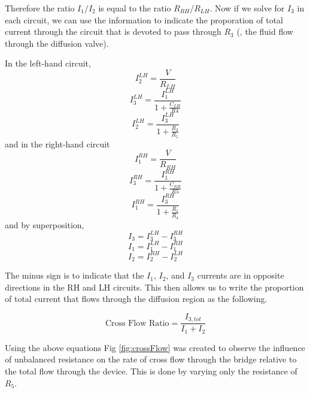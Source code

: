Therefore the ratio $I_{1}/I_{2}$ is equal to the ratio $R_{RH}/R_{LH}$. Now if we solve for $I_{3}$ in each circuit, we can use the information to indicate the proporation of total current through the circuit that is devoted to pass through $R_{3}$ (\ie , the fluid flow through the diffusion valve).

In the left-hand circuit, 
\begin{equation}
I_{2}^{LH} =\frac{V}{R_{LH}}
\end{equation}
\begin{equation}
I_{3}^{LH} =\frac{I_{1}^{LH}}{1+ \frac{C_{LH}}{R4}}
\label{equ:LHI3}
\end{equation}
\begin{equation}
I_{2}^{LH} =\frac{I_{3}^{LH}}{1+\frac{R_{2}}{R_{5}}}
\end{equation}
and in the right-hand circuit
\begin{equation}
I_{1}^{RH} =\frac{V}{R_{RH}}
\end{equation}
\begin{equation}
I_{3}^{RH} =\frac{I_{1}^{RH}}{1+ \frac{C_{RH}}{R5}}
\label{equ:LHI3b}
\end{equation}
\begin{equation}
I_{1}^{RH} =\frac{I_{3}^{RH}}{1+\frac{R_{1}}{R_{4}}}
\end{equation}
and by superposition,
\begin{equation}
I_{3} = I_{3}^{LH} - I_{3}^{RH}
\label{equ:I3}
\end{equation}
\begin{equation}
I_{1} = I_{1}^{LH} - I_{1}^{RH}
\label{equ:I1}
\end{equation}
\begin{equation}
I_{2} = I_{2}^{RH} - I_{2}^{LH}
\label{equ:I2}
\end{equation}

The minus sign is to indicate that the $I_{1}$, $I_{2}$, and $I_{3}$ currents are in opposite directions in the RH and LH circuits. This then allows us to write the proportion of total current that flows through the diffusion region as the following.

\begin{equation}
\textrm{Cross Flow Ratio} = \frac{I_{3, tot}}{I_{1} + I_{2}}
\end{equation}

Using the above equations Fig \ref{fig:crossFlow} was created to observe the influence of unbalanced resistance on the rate of cross flow through the bridge relative to the total flow through the device. This is done by varying only the resistance of $R_{5}$.

